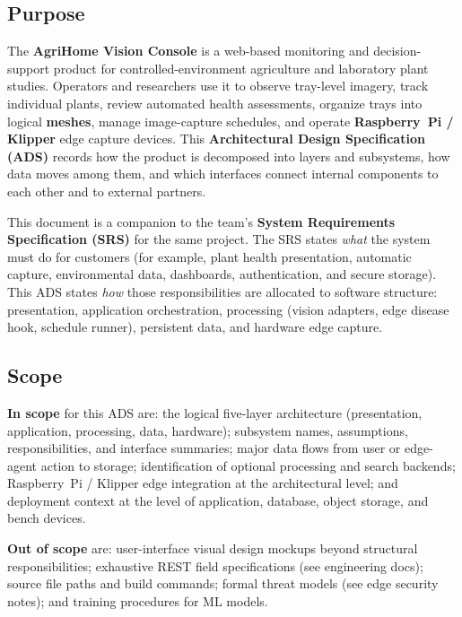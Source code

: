 \subsection{Purpose}

The \textbf{AgriHome Vision Console} is a web-based monitoring and decision-support product for controlled-environment agriculture and laboratory plant studies. Operators and researchers use it to observe tray-level imagery, track individual plants, review automated health assessments, organize trays into logical \textbf{meshes}, manage image-capture schedules, and operate \textbf{Raspberry~Pi / Klipper} edge capture devices. This \textbf{Architectural Design Specification (ADS)} records how the product is decomposed into layers and subsystems, how data moves among them, and which interfaces connect internal components to each other and to external partners.

This document is a companion to the team's \textbf{System Requirements Specification (SRS)} for the same project.\cite{srs} The SRS states \emph{what} the system must do for customers (for example, plant health presentation, automatic capture, environmental data, dashboards, authentication, and secure storage). This ADS states \emph{how} those responsibilities are allocated to software structure: presentation, application orchestration, processing (vision adapters, edge disease hook, schedule runner), persistent data, and hardware edge capture.

\subsection{Scope}

\textbf{In scope} for this ADS are: the logical five-layer architecture (presentation, application, processing, data, hardware); subsystem names, assumptions, responsibilities, and interface summaries; major data flows from user or edge-agent action to storage; identification of optional processing and search backends; Raspberry~Pi / Klipper edge integration at the architectural level; and deployment context at the level of application, database, object storage, and bench devices.\cite{edgeops}

\textbf{Out of scope} are: user-interface visual design mockups beyond structural responsibilities; exhaustive REST field specifications (see engineering docs); source file paths and build commands; formal threat models (see edge security notes); and training procedures for ML models.

